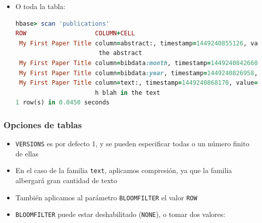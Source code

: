 \documentclass[14pt]{beamer}
\begin{document}
\begin{frame}
\begin{itemize}
\framebreak

\item O toda la tabla:
\begin{lstlisting}[language=ruby,basicstyle=\tiny\tt]
hbase> scan 'publications'
ROW                   COLUMN+CELL
 My First Paper Title column=abstract:, timestamp=1449240855126, value=blah blah
                       the abstract
 My First Paper Title column=bibdata:month, timestamp=1449240842660, value=June
 My First Paper Title column=bibdata:year, timestamp=1449240826958, value=2015
 My First Paper Title column=text:, timestamp=1449240868170, value=much more bla
                      h blah in the text
1 row(s) in 0.0450 seconds
\end{lstlisting}
\end{itemize}

\end{frame}

\begin{frame}[allowframebreaks]
  \frametitle{Opciones de tablas}
\begin{itemize}
\item {\tt VERSIONS} es por defecto 1, y se pueden especificar todas o un
  número finito de ellas
\item En el caso de la familia {\tt text}, aplicamos compresión, ya que la
  familia albergará gran cantidad de texto
\item También aplicamos al parámetro {\tt BLOOMFILTER} el valor {\tt ROW}
\framebreak
\item {\tt BLOOMFILTER} puede estar deshabilitado ({\tt NONE}), o tomar dos
  valores:
\end{itemize}
\end{frame}
\end{document}
